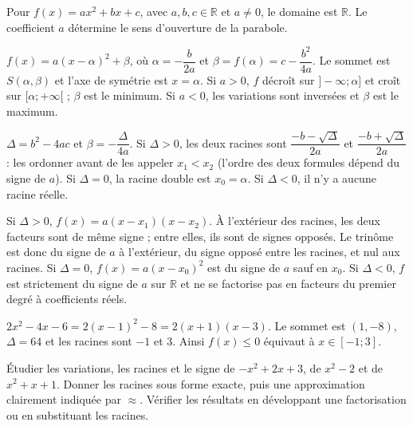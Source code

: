\documentclass[11pt]{article}
\begin{document}
Pour $f(x)=ax^2+bx+c$, avec $a,b,c\in\mathbb R$ et $a\ne0$, le domaine est $\mathbb R$. Le coefficient $a$ détermine le sens d’ouverture de la parabole.\par
{}
$f(x)=a(x-\alpha)^2+\beta$, où $\alpha=-\dfrac{b}{2a}$ et $\beta=f(\alpha)=c-\dfrac{b^2}{4a}$. Le sommet est $S(\alpha,\beta)$ et l’axe de symétrie est $x=\alpha$. Si $a>0$, $f$ décroît sur $]-\infty;\alpha]$ et croît sur $[\alpha;+\infty[$ ; $\beta$ est le minimum. Si $a<0$, les variations sont inversées et $\beta$ est le maximum.\par
{}
$\Delta=b^2-4ac$ et $\beta=-\dfrac{\Delta}{4a}$. Si $\Delta>0$, les deux racines sont $\dfrac{-b-\sqrt\Delta}{2a}$ et $\dfrac{-b+\sqrt\Delta}{2a}$ : les ordonner avant de les appeler $x_1<x_2$ (l’ordre des deux formules dépend du signe de $a$). Si $\Delta=0$, la racine double est $x_0=\alpha$. Si $\Delta<0$, il n’y a aucune racine réelle.\par
{}
Si $\Delta>0$, $f(x)=a(x-x_1)(x-x_2)$. À l’extérieur des racines, les deux facteurs sont de même signe ; entre elles, ils sont de signes opposés. Le trinôme est donc du signe de $a$ à l’extérieur, du signe opposé entre les racines, et nul aux racines. Si $\Delta=0$, $f(x)=a(x-x_0)^2$ est du signe de $a$ sauf en $x_0$. Si $\Delta<0$, $f$ est strictement du signe de $a$ sur $\mathbb R$ et ne se factorise pas en facteurs du premier degré à coefficients réels.\par
{}
$2x^2-4x-6=2(x-1)^2-8=2(x+1)(x-3)$. Le sommet est $(1,-8)$, $\Delta=64$ et les racines sont $-1$ et $3$. Ainsi $f(x)\le0$ équivaut à $x\in[-1;3]$.\par
\begin{center}\end{center}
Étudier les variations, les racines et le signe de $-x^2+2x+3$, de $x^2-2$ et de $x^2+x+1$. Donner les racines sous forme exacte, puis une approximation clairement indiquée par $\approx$. Vérifier les résultats en développant une factorisation ou en substituant les racines.\par
\end{document}

